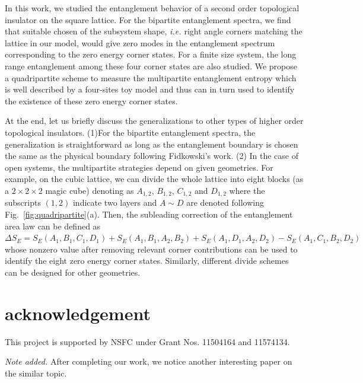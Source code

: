 \documentclass[twocolumn,superscriptaddress]{revtex4-1}
\newcommand{\ie}{\textit{i.e.{ }}}
\begin{document}
In this work, we studied the entanglement behavior of a second order topological insulator on the square lattice. For the bipartite entanglement spectra, we find that suitable chosen of the subsystem shape, \ie right angle corners matching the lattice in our model, would give zero modes in the entanglement spectrum corresponding to the zero energy corner states. For a finite size system, the long range entanglement among these four corner states are also studied. We propose a quadripartite scheme to measure the multipartite entanglement entropy which is well described by a four-sites toy model and thus can in turn used to identify the existence of these zero energy corner states. 

At the end, let us briefly discuss the generalizations to other types of higher order topological insulators. (1)For the bipartite entanglement spectra, the generalization is straightforward as long as the entanglement boundary is chosen the same as the physical boundary following Fidkowski's work. \cite{Fidkowski_PRL_2010} (2) In the case of open systems, the multipartite strategies depend on given geometries. For example, on the cubic lattice, we can divide the whole lattice into eight blocks (as a $2\times2\times2$ magic cube) denoting as $A_{1,2}$, $B_{1,2}$, $C_{1,2}$ and $D_{1,2}$ where the subscripts $(1,2)$ indicate two layers and $A\sim D$ are denoted following Fig.~\ref{fig:quadripartite}(a). Then, the subleading correction of the entanglement area law can be defined as $\Delta S_E= S_E(A_1,B_1,C_1,D_1)+S_E(A_1,B_1,A_2,B_2)+S_E(A_1,D_1,A_2,D_2)-S_E(A_1,C_1,B_2,D_2)$ whose nonzero value after removing relevant corner contributions can be used to identify the eight zero energy corner states. Similarly, different divide schemes can be designed for other geometries. 

\section{acknowledgement}
This project is supported by NSFC under Grant Nos. 11504164 and 11574134.

{\it Note added.} After completing our work, we notice another interesting paper \cite{Fukui_PRB_2018} on the similar topic.


\end{document}
